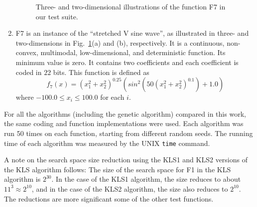 \documentclass{article}
\begin{document}
\begin{enumerate}
\begin{figure}[ht]
  \centering
  \subfloat[3d]{{\texttt{[image: f7-3d]}}}
  \qquad
  \subfloat[2d]{{\texttt{[image: f7-2d]}}}  
  \caption{Three- and two-dimensional illustrations of the function F7
    in our test suite.}
  \label{fig:f7-3d}
\end{figure}

\item F7 is an instance of the “stretched V sine wave”, as illustrated
  in three- and two-dimensions in Fig.~\ref{fig:f7-3d}(a) and (b),
  respectively. It is a continuous, non-convex, multimodal,
  low-dimensional, and deterministic function. Its minimum value is
  zero. It contains two coefficients and each coefficient is coded in
  $22$ bits. This function is defined as
\begin{equation}
f_{7}(x)=(x_{1}^{2}+x_{2}^{2})^{0.25}(sin^{2}(50(x_{1}^{2}+x_{2}^{2})^{0.1})+1.0)
\end{equation}
where $-100.0\leq x_{i}\leq 100.0$ for each $i$.
\end{enumerate}

For all the algorithms (including the genetic algorithm) compared in
this work, the same coding and function implementations were
used. Each algorithm was run 50 times on each function, starting from
different random seeds. The running time of each algorithm was
measured by the UNIX \verb|time| command.

A note on the search space size reduction using the KLS1 and KLS2
versions of the KLS algorithm follows: The size of the search space
for F1 in the KLS algorithm is $2^{30}$. In the case of the KLS1
algorithm, the size reduces to about $11^{3}\approx 2^{10}$, and in
the case of the KLS2 algorithm, the size also reduces to $2^{10}$. The
reductions are more significant some of the other test functions.
\end{document}
